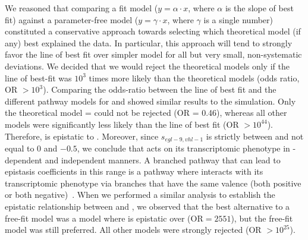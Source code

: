 We reasoned that comparing a fit model ($y = \alpha\cdot x$, where $\alpha$ is
the slope of best fit) against a parameter-free model ($y = \gamma\cdot x$,
where $\gamma$ is a single number) constituted a conservative approach towards
selecting which theoretical model (if any) best explained the data. In particular,
this approach will tend to strongly favor the line of best fit over simpler model
for all but very small, non-systematic deviations. We decided
that we would reject the theoretical models only if the line of best-fit
was $10^3$ times more likely than the theoretical models (odds ratio, OR $>10^3$).
Comparing the odds-ratio between the line of best fit and the different pathway
models for  and  showed similar results to the simulation.
Only the theoretical model \egl{} = \eglvhl{} could not be rejected (OR = 0.46),
whereas all other models were significantly less likely than the line of best fit
(OR $>10^{44}$).
Therefore,  is epistatic to . Moreover,
since $s_{egl-9, vhl-1}$ is strictly between and not equal to $0$ and $-0.5$, we
conclude that  acts on its transcriptomic phenotype in
-dependent and independent manners. A branched pathway that can lead
to epistasis coefficients in this range is a pathway where  interacts
with its transcriptomic phenotype via branches that have the same valence (both
positive or both negative)~\citep{Shao2009}. When we performed a similar analysis
to establish the epistatic relationship between  and ,
we observed that the best alternative to a free-fit model was a model where
 is epistatic over  (OR$=2551$), but the free-fit model
was still preferred. All other models were strongly rejected (OR $>10^{25}$).

